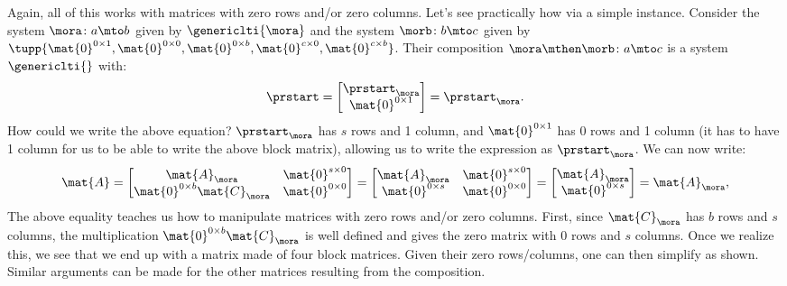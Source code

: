 \begin{remark}
    Again, all of this works with matrices with zero rows and/or zero columns.
    Let's see practically how via a simple instance.
    Consider the system $\mora\colon a \mto b$ given by $\genericlti{\mora}$ and the system $\morb\colon b\mto c$ given by $\tupp{\mat{0}^{0\times 1},\mat{0}^{0\times 0}, \mat{0}^{0\times b}, \mat{0}^{c\times 0}, \mat{0}^{c\times b}}$.
    Their composition $\mora\mthen \morb\colon a\mto c$ is a system $\genericlti{}$ with:
    \begin{equation*}
        \prstart=\begin{bmatrix} \prstart_\mora \\ \mat{0}^{0\times 1}\end{bmatrix}=\prstart_\mora.
    \end{equation*}
    How could we write the above equation?
    $\prstart_\mora$ has $s$ rows and 1 column, and $\mat{0}^{0\times 1}$ has 0 rows and 1 column (it has to have 1 column for us to be able to write the above block matrix), allowing us to write the expression as $\prstart_\mora$.
    We can now write:
    \begin{equation*}
        \mat{A}=\begin{bmatrix}
            \mat{A}_\mora                    & \mat{0}^{s\times 0} \\
            \mat{0}^{0\times b}\mat{C}_\mora & \mat{0}^{0\times 0}
        \end{bmatrix}=
        \begin{bmatrix}
            \mat{A}_\mora       & \mat{0}^{s\times 0} \\
            \mat{0}^{0\times s} & \mat{0}^{0\times 0}
        \end{bmatrix}=\begin{bmatrix}
            \mat{A}_\mora \\
            \mat{0}^{0\times s}\end{bmatrix}=\mat{A}_\mora,
    \end{equation*}
    The above equality teaches us how to manipulate matrices with zero rows and/or zero columns.
    First, since $\mat{C}_\mora$ has $b$ rows and $s$ columns, the multiplication $\mat{0}^{0\times b}\mat{C}_\mora$ is well defined and gives the zero matrix with 0 rows and $s$ columns.
    Once we realize this, we see that we end up with a matrix made of four block matrices.
    Given their zero rows/columns, one can then simplify as shown.
    Similar arguments can be made for the other matrices resulting from the composition.
\end{remark}

